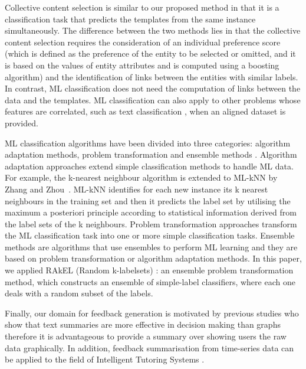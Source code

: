 \documentclass[11pt]{article}
\begin{document}
Collective content selection \cite{Barzilay2004a} is similar to our proposed method in that 
it is a classification task that predicts 
the templates from the same instance simultaneously. The
difference between the two methods lies in that
the collective content selection requires the consideration
of an individual preference score (which is
defined as the preference of the entity to be selected
or omitted, and it is based on the values of
entity attributes and is computed using a boosting
algorithm) and the identification of links between
the entities with similar labels. In contrast, ML
classification does not need the computation
of links between the data and the templates.
ML classification can also apply to other problems whose features are correlated, such as 
text classification \cite{Madjarov:2012}, when an aligned dataset is provided.

\raggedbottom
ML classification algorithms have been divided into three categories: algorithm
adaptation methods, problem transformation and ensemble methods \cite{Tsoumakas07,Madjarov:2012}. 
Algorithm adaptation approaches \cite{Tsoumakas:2007}
extend simple classification methods to handle ML data. For example, the k-nearest
neighbour algorithm is extended to ML-kNN by Zhang and Zhou~. 
ML-kNN identifies for each new instance its k nearest neighbours in the training set and
then it predicts the label set by utilising the maximum a posteriori principle according to 
statistical information derived from the label sets of the k neighbours. 
Problem transformation approaches \cite{Tsoumakas07} transform the ML classification task into one 
or more simple classification tasks. Ensemble methods \cite{Tsoumakas:2007} are algorithms that use ensembles to perform ML learning
and they are based on problem transformation or algorithm adaptation methods. In this paper,
we applied RAkEL (Random k-labelsets) \cite{Tsoumakas:2007}: an ensemble problem transformation
 method, which constructs an ensemble of simple-label classifiers, where each one 
 deals with a random subset of the labels.

Finally, our domain for feedback generation is motivated by previous studies
\cite{Law2005,Meulen2010} who show that text
 summaries are more effective in decision making than graphs therefore
 it is advantageous to provide a summary over showing users the raw
 data graphically. In addition, feedback summarisation from
 time-series data can be  applied to the field of Intelligent 
Tutoring Systems \cite{TUC-HCIS}.
\end{document}

